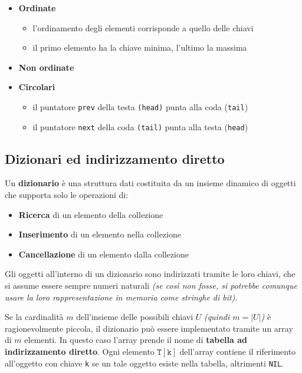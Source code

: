 \documentclass[italian, 10pt]{article}
\begin{document}
\begin{itemize}
  \item \textbf{Ordinate}
        \begin{itemize}
          \item l'ordinamento degli elementi corrisponde a quello delle chiavi
          \item il primo elemento ha la chiave minima, l'ultimo la massima
        \end{itemize}
  \item \textbf{Non ordinate}
  \item \textbf{Circolari}
        \begin{itemize}
          \item il puntatore \texttt{prev} della testa \texttt{(\texttt{head})} punta alla coda (\texttt{tail})
          \item il puntatore \texttt{next} della coda \texttt{(\texttt{tail})} punta alla testa (\texttt{head})
        \end{itemize}
\end{itemize}

\subsection{Dizionari ed indirizzamento diretto}

Un \textbf{dizionario} è una struttura dati costituita da un insieme dinamico di oggetti che supporta solo le operazioni di:

\begin{itemize}
  \item \textbf{Ricerca} di un elemento della collezione
  \item \textbf{Inserimento} di un elemento nella collezione
  \item \textbf{Cancellazione} di un elemento dalla collezione
\end{itemize}

Gli oggetti all'interno di un dizionario sono indirizzati tramite le loro chiavi, che si assume essere sempre numeri naturali \textit{(se così non fosse, si potrebbe comunque usare la loro rappresentazione in memoria come stringhe di bit)}.

Se la cardinalità \(m\) dell'insieme delle possibili chiavi \(U\) \textit{(quindi \(m = |U|\))} è ragionevolmente piccola, il dizionario può essere implementato tramite un array di \(m\) elementi.
In questo caso l'array prende il nome di \textbf{tabella ad indirizzamento diretto}.
Ogni elemento \(\texttt{T}[\texttt{k}]\) dell'array contiene il riferimento all'oggetto con chiave \texttt{k} se un tale oggetto esiste nella tabella, altrimenti \texttt{NIL}.
\end{document}

